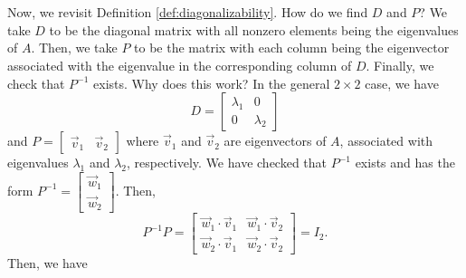         \pagebreak
        \vphantom
        \\
        \\
        Now, we revisit Definition \ref{def:diagonalizability}. How do we find \(D\) and \(P\)? We take \(D\) to be the diagonal matrix with all nonzero elements being the eigenvalues of \(A\). Then, we take \(P\) to be the matrix with each column being the eigenvector associated with the eigenvalue in the corresponding column of \(D\). Finally, we check that \(P^{-1}\) exists. Why does this work? In the general \(2\times 2\) case, we have
        \begin{equation*}
            D=\begin{bmatrix}
                \lambda_1 & 0 \\ 0 & \lambda_2
            \end{bmatrix}
        \end{equation*}
        and \(P=\begin{bmatrix} \vec{v}_1 & \vec{v}_2 \end{bmatrix}\) where \(\vec{v}_1\) and \(\vec{v}_2\) are eigenvectors of \(A\), associated with eigenvalues \(\lambda_1\) and \(\lambda_2\), respectively. We have checked that \(P^{-1}\) exists and has the form \(P^{-1}=\begin{bmatrix} \vec{w}_1 \\ \vec{w}_2 \end{bmatrix}\). Then, 
        \begin{equation*}
            P^{-1}P=\begin{bmatrix} \vec{w}_1\cdot\vec{v}_1 & \vec{w}_1\cdot\vec{v}_2 \\ \vec{w}_2\cdot\vec{v}_1 & \vec{w}_2\cdot\vec{v}_2 \end{bmatrix}=I_2.
        \end{equation*}
        Then, we have
